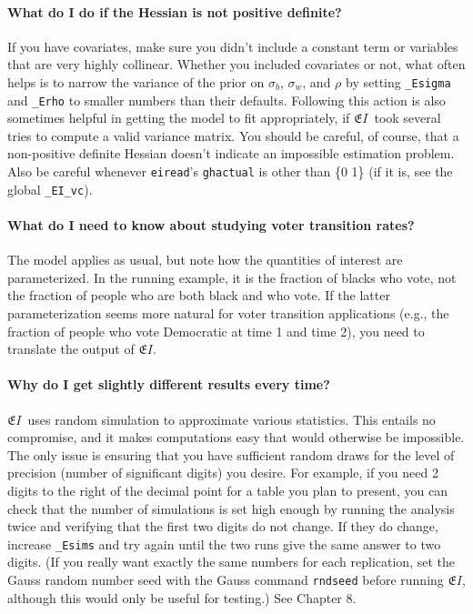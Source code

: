 \documentclass[11pt,titlepage]{article}
\newcommand{\EI}{\ensuremath{{\mathfrak EI}}}
\begin{document}
\paragraph{What do I do if the Hessian is not positive definite?}  If
you have covariates, make sure you didn't include a constant term or
variables that are very highly collinear.  Whether you included
covariates or not, what often helps is to narrow the variance of the
prior on $\sigma_b$, $\sigma_w$, and $\rho$ by setting
\texttt{\_Esigma} and \texttt{\_Erho} to smaller numbers than their
defaults.  Following this action is also sometimes helpful in getting
the model to fit appropriately, if \EI\ took several tries to compute
a valid variance matrix.  You should be careful, of course, that a
non-positive definite Hessian doesn't indicate an impossible
estimation problem.  Also be careful whenever \texttt{eiread}'s
\texttt{ghactual} is other than \{0 1\} (if it is, see the global
\texttt{\_EI\_vc}).

\paragraph{What do I need to know about studying voter transition
  rates?}  The model applies as usual, but note how the quantities of
interest are parameterized.  In the running example, it is the
fraction of blacks who vote, not the fraction of people who are both
black and who vote.  If the latter parameterization seems more natural
for voter transition applications (e.g., the fraction of people who
vote Democratic at time 1 and time 2), you need to translate the
output of \EI.

\paragraph{Why do I get slightly different results every time?}
\EI\ uses random simulation to approximate various statistics.  This
entails no compromise, and it makes computations easy that would
otherwise be impossible.  The only issue is ensuring that you have
sufficient random draws for the level of precision (number of
significant digits) you desire.  For example, if you need 2 digits to
the right of the decimal point for a table you plan to present, you
can check that the number of simulations is set high enough by running
the analysis twice and verifying that the first two digits do not
change.  If they do change, increase \texttt{\_Esims} and try again
until the two runs give the same answer to two digits.  (If you really
want exactly the same numbers for each replication, set the Gauss
random number seed with the Gauss command \texttt{rndseed} before
running \EI, although this would only be useful for testing.)  See
Chapter 8.
\end{document}
